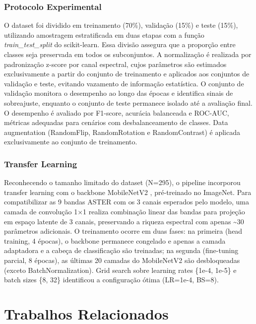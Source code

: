 \documentclass[12pt,twocolumn]{article}
\begin{document}
\subsubsection{Protocolo Experimental}\label{protocolo-experimental}

O dataset foi dividido em treinamento (70\%), validação (15\%) e teste (15\%), utilizando amostragem estratificada em duas etapas com a função \emph{train\_test\_split} do scikit-learn. Essa divisão assegura que a proporção entre classes seja preservada em todos os subconjuntos. A normalização é realizada por padronização z-score por canal espectral, cujos parâmetros são estimados exclusivamente a partir do conjunto de treinamento e aplicados aos conjuntos de validação e teste, evitando vazamento de informação estatística. O conjunto de validação monitora o desempenho ao longo das épocas e identifica sinais de sobreajuste, enquanto o conjunto de teste permanece isolado até a avaliação final. O desempenho é avaliado por F1-score, acurácia balanceada e ROC-AUC, métricas adequadas para cenários com desbalanceamento de classes. Data augmentation (RandomFlip, RandomRotation e RandomContrast) é aplicada exclusivamente ao conjunto de treinamento.

\subsubsection{Transfer Learning}\label{transfer-learning}

Reconhecendo o tamanho limitado do dataset (N=295), o pipeline incorporou transfer learning com o backbone MobileNetV2 \cite{sandler2018}, pré-treinado no ImageNet. Para compatibilizar as 9 bandas ASTER com os 3 canais esperados pelo modelo, uma camada de convolução 1×1 realiza combinação linear das bandas para projeção em espaço latente de 3 canais, preservando a riqueza espectral com apenas \textasciitilde30 parâmetros adicionais. O treinamento ocorre em duas fases: na primeira (head training, 4 épocas), o backbone permanece congelado e apenas a camada adaptadora e a cabeça de classificação são treinadas; na segunda (fine-tuning parcial, 8 épocas), as últimas 20 camadas do MobileNetV2 são desbloqueadas (exceto BatchNormalization). Grid search sobre learning rates \{1e-4, 1e-5\} e batch sizes \{8, 32\} identificou a configuração ótima (LR=1e-4, BS=8).

\section{Trabalhos Relacionados}\label{trabalhos-relacionados}
\end{document}
